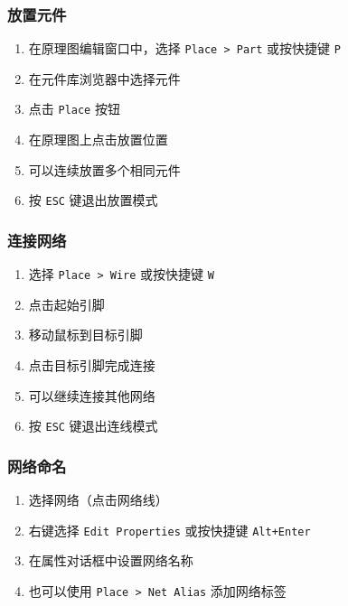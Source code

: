\subsubsection{放置元件}


\begin{enumerate}
  \item 在原理图编辑窗口中，选择 \lstinline{Place > Part} 或按快捷键 \lstinline{P}
  \item 在元件库浏览器中选择元件
  \item 点击 \lstinline{Place} 按钮
  \item 在原理图上点击放置位置
  \item 可以连续放置多个相同元件
  \item 按 \lstinline{ESC} 键退出放置模式
\end{enumerate}

\subsubsection{连接网络}


\begin{enumerate}
  \item 选择 \lstinline{Place > Wire} 或按快捷键 \lstinline{W}
  \item 点击起始引脚
  \item 移动鼠标到目标引脚
  \item 点击目标引脚完成连接
  \item 可以继续连接其他网络
  \item 按 \lstinline{ESC} 键退出连线模式
\end{enumerate}

\subsubsection{网络命名}


\begin{enumerate}
  \item 选择网络（点击网络线）
  \item 右键选择 \lstinline{Edit Properties} 或按快捷键 \lstinline{Alt+Enter}
  \item 在属性对话框中设置网络名称
  \item 也可以使用 \lstinline{Place > Net Alias} 添加网络标签
\end{enumerate}

